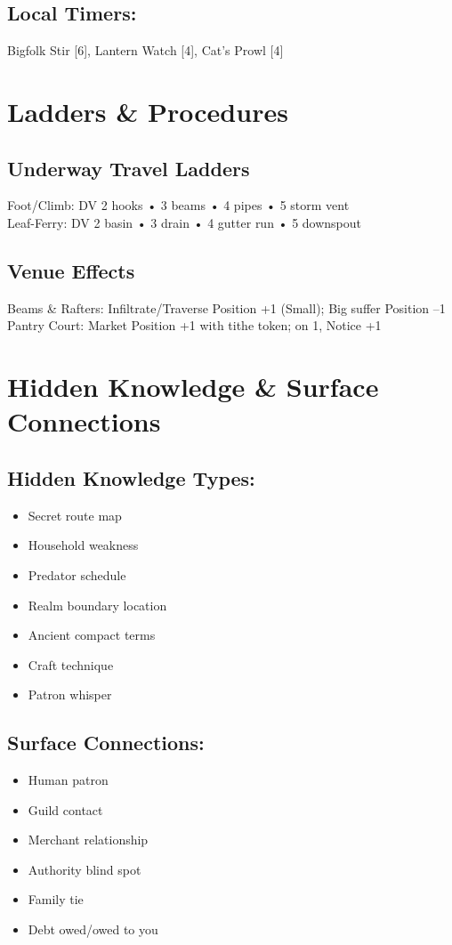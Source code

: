 \documentclass[11pt]{book}
\begin{document}
\subsection*{Local Timers:}
Bigfolk Stir [6], Lantern Watch [4], Cat's Prowl [4]

\section{Ladders \& Procedures}
\subsection*{Underway Travel Ladders}
Foot/Climb: DV 2 hooks • 3 beams • 4 pipes • 5 storm vent \\
Leaf-Ferry: DV 2 basin • 3 drain • 4 gutter run • 5 downspout

\subsection*{Venue Effects}
Beams \& Rafters: Infiltrate/Traverse Position +1 (Small); Big suffer Position --1 \\
Pantry Court: Market Position +1 with tithe token; on 1, Notice +1

\section{Hidden Knowledge \& Surface Connections}
\subsection*{Hidden Knowledge Types:}
\begin{itemize}[leftmargin=*]
\item Secret route map
\item Household weakness
\item Predator schedule
\item Realm boundary location
\item Ancient compact terms
\item Craft technique
\item Patron whisper
\end{itemize}

\subsection*{Surface Connections:}
\begin{itemize}[leftmargin=*]
\item Human patron
\item Guild contact
\item Merchant relationship
\item Authority blind spot
\item Family tie
\item Debt owed/owed to you
\end{itemize}
\end{document}
